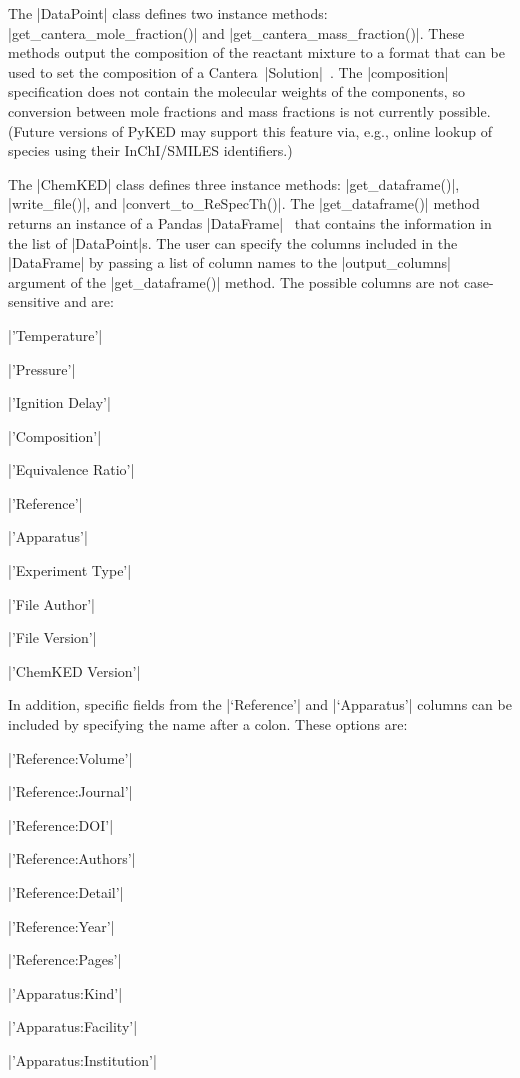 \documentclass[12pt]{ijck}
\newcommand\pk{PyKED}
\begin{document}
The \pybox|DataPoint| class defines two instance methods:
\pybox|get_cantera_mole_fraction()| and \pybox|get_cantera_mass_fraction()|.
These methods output the composition of the reactant mixture to a
format that can be used to set the composition of a
Cantera~\pybox|Solution|~\autocite{Cantera:2.3.0}.
The \pybox|composition| specification does not contain the molecular
weights of the components, so conversion between mole fractions and mass
fractions is not currently possible. (Future versions of \pk{} may support this
feature via, e.g., online lookup of species using their InChI\slash SMILES
identifiers.)

The \pybox|ChemKED| class defines three instance methods:
\pybox|get_dataframe()|, \pybox|write_file()|, and \pybox|convert_to_ReSpecTh()|.
The \pybox|get_dataframe()| method returns an instance of a
Pandas \pybox|DataFrame|~\autocite{pandas} that contains the information in the
list of \pybox|DataPoint|s. The user can specify the columns included in the
\pybox|DataFrame| by passing a list of column names to the
\pybox|output_columns| argument of the \pybox|get_dataframe()| method. The
possible columns are not case-sensitive and are:
%
\noindent\begin{itemize*}
    \item \pybox|'Temperature'|
    \item \pybox|'Pressure'|
    \item \pybox|'Ignition Delay'|
    \item \pybox|'Composition'|
    \item \pybox|'Equivalence Ratio'|
    \item \pybox|'Reference'|
    \item \pybox|'Apparatus'|
    \item \pybox|'Experiment Type'|
    \item \pybox|'File Author'|
    \item \pybox|'File Version'|
    \item \pybox|'ChemKED Version'|
\end{itemize*}

In addition, specific fields from the \pybox|`Reference'| and \pybox|`Apparatus'|
columns can be included by specifying the name after a colon. These options
are:
%
\noindent\begin{itemize*}
    \item \pybox|'Reference:Volume'|
    \item \pybox|'Reference:Journal'|
    \item \pybox|'Reference:DOI'|
    \item \pybox|'Reference:Authors'|
    \item \pybox|'Reference:Detail'|
    \item \pybox|'Reference:Year'|
    \item \pybox|'Reference:Pages'|
    \item \pybox|'Apparatus:Kind'|
    \item \pybox|'Apparatus:Facility'|
    \item \pybox|'Apparatus:Institution'|
\end{itemize*}
\end{document}
